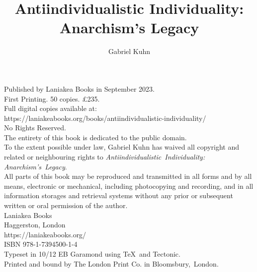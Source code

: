 \documentclass{book}
\title{Antiindividualistic Individuality: Anarchism’s Legacy}
\author{Gabriel Kuhn}
\date{}
\begin{document}
\frontmatter %
\pagestyle{empty} %

\maketitle

\vspace*{\fill}
\begin{center}
{
    \small
    Published by Laniakea Books in September 2023.\\
    \vspace{1em}
    First Printing. 50 copies. £235.\\
    \vspace{1em}
    Full digital copies available at:\\
    \mbox{https://laniakeabooks.org/books/antiindividualistic-individuality/}\\
    \vspace{1em}
    No Rights Reserved.\\
    \vspace{1em}
    The entirety of this book is dedicated to the public domain.\\
    \vspace{1em}
    To the extent possible under law, Gabriel Kuhn has waived all copyright and
    related or neighbouring rights to \textit{Antiindividualistic~Individuality: Anarchism’s~Legacy}.\\
    \vspace{1em}
    All parts of this book may be reproduced and transmitted in all forms and by
    all means, electronic or mechanical, including photocopying and recording,
    and in all information storages and retrieval systems without any prior or
    subsequent written or oral permission of the author.\\
    \vspace{1em}
    Laniakea Books\\
    Haggerston, London\\
    https://laniakeabooks.org/\\
    \vspace{1em}
    ISBN 978-1-7394500-1-4\\
    \vspace{1em}
    Typeset in 10/12 EB Garamond using \TeX\ and Tectonic.\\
    Printed and bound by The London Print Co. in Bloomsbury,~London.
}
\end{center}

\mainmatter %
\pagestyle{fancy} %
\end{document}

